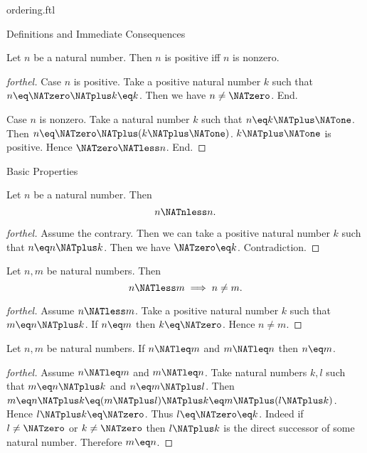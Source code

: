 \documentclass{naproche-library}
\begin{document}
\begin{smodule}[title=The Standard Ordering of the Natural Numbers]{ordering.ftl}
\begin{sfragment}{Definitions and Immediate Consequences}
  \begin{proposition}[forthel,id=ARITHMETIC_04_4826285599621120]
    Let $n$ be a natural number.
    Then $n$ is positive iff $n$ is nonzero.
  \end{proposition}
  \begin{proof}[forthel]
    Case $n$ is positive.
      Take a positive natural number $k$ such that $n \eq \NATzero \NATplus k \eq k$.
      Then we have $n \neq \NATzero$.
    End.

    Case $n$ is nonzero.
      Take a natural number $k$ such that $n \eq k \NATplus \NATone$.
      Then $n \eq \NATzero \NATplus (k \NATplus \NATone)$.
      $k \NATplus \NATone$ is positive.
      Hence $\NATzero \NATless n$.
    End.
  \end{proof}
\end{sfragment}

\begin{sfragment}{Basic Properties}
  \begin{proposition}[forthel,id=ARITHMETIC_04_1037693395927040]
    Let $n$ be a natural number.
    Then \[ n \NATnless n. \]
  \end{proposition}
  \begin{proof}[forthel]
    Assume the contrary.
    Then we can take a positive natural number $k$ such that $n \eq n \NATplus k$.
    Then we have $\NATzero \eq k$.
    Contradiction.
  \end{proof}

  \begin{proposition}[forthel,id=ARITHMETIC_04_8266284905005056]
    Let $n, m$ be natural numbers.
    Then \[ n \NATless m \implies n \neq m. \]
  \end{proposition}
  \begin{proof}[forthel]
    Assume $n \NATless m$.
    Take a positive natural number $k$ such that $m \eq n \NATplus k$.
    If $n \eq m$ then $k \eq \NATzero$.
    Hence $n \neq m$.
  \end{proof}

  \begin{proposition}[forthel,id=ARITHMETIC_04_4190604718243840]
    Let $n, m$ be natural numbers.
    If $n \NATleq m$ and $m \NATleq n$ then $n \eq m$.
  \end{proposition}
  \begin{proof}[forthel]
    Assume $n \NATleq m$ and $m \NATleq n$.
    Take natural numbers $k, l$ such that $m \eq n \NATplus k$ and $n \eq m \NATplus l$.
    Then $m
      \eq n \NATplus k
      \eq (m \NATplus l) \NATplus k
      \eq m \NATplus (l \NATplus k)$.
    Hence $l \NATplus k \eq \NATzero$.
    Thus $l \eq \NATzero \eq k$.
    Indeed if $l \neq \NATzero$ or $k \neq \NATzero$ then $l \NATplus k$ is the direct successor of
    some natural number.
    Therefore $m \eq n$.
  \end{proof}


\end{sfragment}
\end{smodule}
\end{document}
